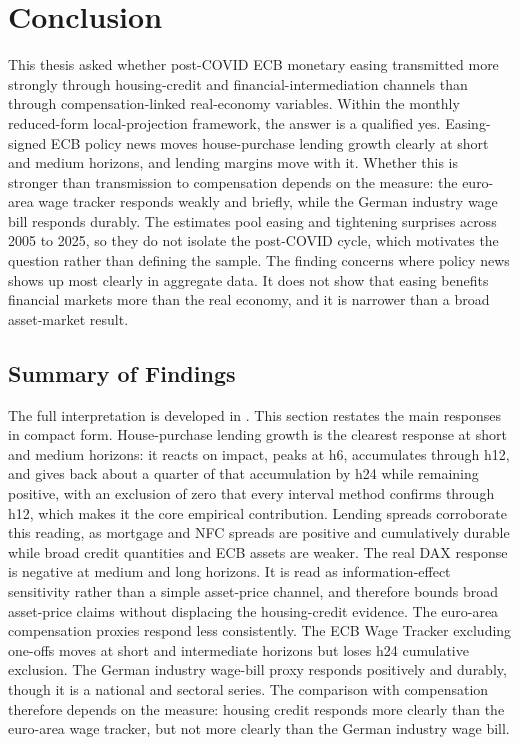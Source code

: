 \chapter{Conclusion}
\label{chap:conclusion}

This thesis asked whether post-COVID ECB monetary easing transmitted more strongly through housing-credit and financial-intermediation channels than through compensation-linked real-economy variables. Within the monthly reduced-form local-projection framework, the answer is a qualified yes. Easing-signed ECB policy news moves house-purchase lending growth clearly at short and medium horizons, and lending margins move with it. Whether this is stronger than transmission to compensation depends on the measure: the euro-area wage tracker responds weakly and briefly, while the German industry wage bill responds durably. The estimates pool easing and tightening surprises across 2005 to 2025, so they do not isolate the post-COVID cycle, which motivates the question rather than defining the sample. The finding concerns where policy news shows up most clearly in aggregate data. It does not show that easing benefits financial markets more than the real economy, and it is narrower than a broad asset-market result.

\section{Summary of Findings}

The full interpretation is developed in . This section restates the main responses in compact form. House-purchase lending growth is the clearest response at short and medium horizons: it reacts on impact, peaks at h6, accumulates through h12, and gives back about a quarter of that accumulation by h24 while remaining positive, with an exclusion of zero that every interval method confirms through h12, which makes it the core empirical contribution. Lending spreads corroborate this reading, as mortgage and NFC spreads are positive and cumulatively durable while broad credit quantities and ECB assets are weaker. The real DAX response is negative at medium and long horizons. It is read as information-effect sensitivity rather than a simple asset-price channel, and therefore bounds broad asset-price claims without displacing the housing-credit evidence. The euro-area compensation proxies respond less consistently. The ECB Wage Tracker excluding one-offs moves at short and intermediate horizons but loses h24 cumulative exclusion. The German industry wage-bill proxy responds positively and durably, though it is a national and sectoral series. The comparison with compensation therefore depends on the measure: housing credit responds more clearly than the euro-area wage tracker, but not more clearly than the German industry wage bill.

